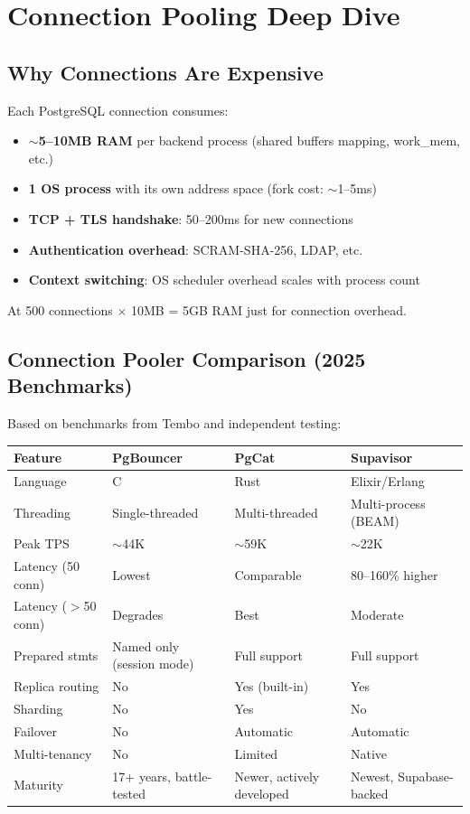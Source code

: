 \documentclass[12pt,a4paper]{article}
\begin{document}
\section{Connection Pooling Deep Dive}

\subsection{Why Connections Are Expensive}

Each PostgreSQL connection consumes:
\begin{itemize}
    \item \textbf{$\sim$5--10MB RAM} per backend process (shared buffers mapping, work\_mem, etc.)
    \item \textbf{1 OS process} with its own address space (fork cost: $\sim$1--5ms)
    \item \textbf{TCP + TLS handshake}: 50--200ms for new connections
    \item \textbf{Authentication overhead}: SCRAM-SHA-256, LDAP, etc.
    \item \textbf{Context switching}: OS scheduler overhead scales with process count
\end{itemize}

At 500 connections $\times$ 10MB = 5GB RAM just for connection overhead.

\subsection{Connection Pooler Comparison (2025 Benchmarks)}

Based on benchmarks from Tembo and independent testing:

\begin{center}
\begin{tabular}{lp{3cm}p{3cm}p{3cm}}
\toprule
\textbf{Feature} & \textbf{PgBouncer} & \textbf{PgCat} & \textbf{Supavisor} \\
\midrule
Language & C & Rust & Elixir/Erlang \\
Threading & Single-threaded & Multi-threaded & Multi-process (BEAM) \\
Peak TPS & $\sim$44K & $\sim$59K & $\sim$22K \\
Latency (50 conn) & Lowest & Comparable & 80--160\% higher \\
Latency ($>$50 conn) & Degrades & Best & Moderate \\
Prepared stmts & Named only (session mode) & Full support & Full support \\
Replica routing & No & Yes (built-in) & Yes \\
Sharding & No & Yes & No \\
Failover & No & Automatic & Automatic \\
Multi-tenancy & No & Limited & Native \\
Maturity & 17+ years, battle-tested & Newer, actively developed & Newest, Supabase-backed \\
\bottomrule
\end{tabular}
\end{center}
\end{document}
